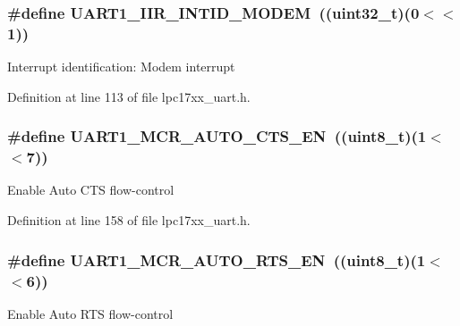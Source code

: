 \subsubsection[{\texorpdfstring{U\+A\+R\+T1\+\_\+\+I\+I\+R\+\_\+\+I\+N\+T\+I\+D\+\_\+\+M\+O\+D\+EM}{UART1_IIR_INTID_MODEM}}]{\setlength{\rightskip}{0pt plus 5cm}\#define U\+A\+R\+T1\+\_\+\+I\+I\+R\+\_\+\+I\+N\+T\+I\+D\+\_\+\+M\+O\+D\+EM~(({\bf uint32\+\_\+t})(0$<$$<$1))}\hypertarget{group___u_a_r_t___private___macros_ga0496801d1096f782e06e6d394836db91}{}\label{group___u_a_r_t___private___macros_ga0496801d1096f782e06e6d394836db91}
Interrupt identification\+: Modem interrupt 

Definition at line 113 of file lpc17xx\+\_\+uart.\+h.

\subsubsection[{\texorpdfstring{U\+A\+R\+T1\+\_\+\+M\+C\+R\+\_\+\+A\+U\+T\+O\+\_\+\+C\+T\+S\+\_\+\+EN}{UART1_MCR_AUTO_CTS_EN}}]{\setlength{\rightskip}{0pt plus 5cm}\#define U\+A\+R\+T1\+\_\+\+M\+C\+R\+\_\+\+A\+U\+T\+O\+\_\+\+C\+T\+S\+\_\+\+EN~(({\bf uint8\+\_\+t})(1$<$$<$7))}\hypertarget{group___u_a_r_t___private___macros_gac7f7f4cc9428e643c0bb4058e7fcb022}{}\label{group___u_a_r_t___private___macros_gac7f7f4cc9428e643c0bb4058e7fcb022}
Enable Auto C\+TS flow-\/control 

Definition at line 158 of file lpc17xx\+\_\+uart.\+h.

\subsubsection[{\texorpdfstring{U\+A\+R\+T1\+\_\+\+M\+C\+R\+\_\+\+A\+U\+T\+O\+\_\+\+R\+T\+S\+\_\+\+EN}{UART1_MCR_AUTO_RTS_EN}}]{\setlength{\rightskip}{0pt plus 5cm}\#define U\+A\+R\+T1\+\_\+\+M\+C\+R\+\_\+\+A\+U\+T\+O\+\_\+\+R\+T\+S\+\_\+\+EN~(({\bf uint8\+\_\+t})(1$<$$<$6))}\hypertarget{group___u_a_r_t___private___macros_gafe3631c1413e045686f07f3716e0baed}{}\label{group___u_a_r_t___private___macros_gafe3631c1413e045686f07f3716e0baed}
Enable Auto R\+TS flow-\/control 

